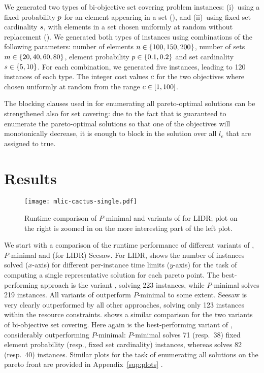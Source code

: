 We generated two types of  bi-objective set covering problem instances:
(i)~using a fixed probability $p$ for an element appearing in a set (\scep{}), and (ii)~using fixed set cardinality $s$, with elements in a set chosen uniformly at random without replacement (\scsc{}).
We generated both types of instances using combinations of the following parameters:
number of elements $n\in\{100,150,200\}$, number of sets $m\in\{20,40,60,80\}$, element probability $p\in\{0.1,0.2\}$ and set cardinality $s\in\{5,10\}$.
For each combination, we generated five instances, leading to 120 instances of each type.
The integer cost values $c$ for the two objectives where chosen uniformly at random from the range $c\in[1,100]$.

The blocking clauses used in \algname{} for enumerating all pareto-optimal solutions can be strengthened also for set covering:
due to the fact that \algname{} is guaranteed to enumerate the pareto-optimal solutions so that one of the objectives will monotonically decrease, it is enough to block in \algname{} the solution over all $l_e$ that are assigned to true.

\section{Results\label{sec:results}}

\begin{figure}
    \centering
    \texttt{[image: mlic-cactus-single.pdf]}
    \caption{Runtime comparison of  $P$-minimal and variants of \algname{} for LIDR; plot on the right
      is zoomed in on the more interesting part of the left plot.
    }\label{fig:mlic-cactus}
\end{figure}

We start with a comparison of the runtime performance of different variants of \algname{}, $P$-minimal and (for LIDR) Seesaw.
For LIDR,  shows the number of instances solved ($x$-axis) for different per-instance time limits ($y$-axis) for the task of computing a single representative solution for each pareto point.
The best-performing approach is the \algname{} variant \msh{}, solving 223 instances, while $P$-minimal solves 219 instances.
All  variants of \algname{} outperform $P$-minimal to some extent.
Seesaw is very clearly outperformed by all other approaches, solving only 123 instances within the resource constraints.
 shows a similar comparison for the two variants of bi-objective set covering.
Here again \msh{} is the best-performing variant of \algname{}, considerably outperforming $P$-minimal:
$P$-minimal solves 71 (resp.~38) fixed element probability (resp., fixed set cardinality) instances, whereas \msh{} solves 82 (resp.~40) instances.
Similar plots for the task of enumerating all solutions on the pareto front are provided in Appendix~\ref{sup:plots} .

